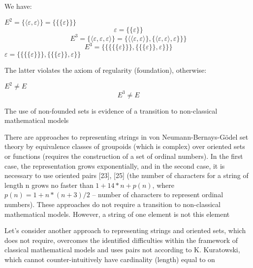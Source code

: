 \documentclass[10pt, a4paper]{article}
\begin{document}
\begin{multicols}{2}
We have:
\begin{center}
\vspace{0.3cm}
$E^2 = \{\langle \varepsilon, \varepsilon \rangle\} = \{\{\{\varepsilon\}\}\}$
\[\varepsilon = \{\{\varepsilon\}\}\]
\[E^3 = \{\langle \varepsilon, \varepsilon, \varepsilon\rangle\} = \{\langle\langle \varepsilon, \varepsilon \rangle\}, \{\langle \varepsilon, \varepsilon \rangle, \varepsilon\}\}\}\]
\[E^3 = \{\{\{\{\{\varepsilon\}\}\}, \{\{\{\varepsilon\}\}, \varepsilon\}\}\}\]
$\varepsilon = \{\{\{\{\varepsilon\}\}\}, \{\{\{\varepsilon\}\}, \varepsilon\}\}$
\vspace{0.35cm}
\end{center}
The latter violates the axiom of regularity (foundation),
otherwise:
\begin{center}
$E^2 \neq E$
\[E^3 \neq E\]
\end{center}
The use of non-founded sets is evidence of a transition
to non-classical mathematical models


There are approaches to representing strings in
von Neumann-Bernays-Gödel set theory by equivalence
classes of groupoids (which is complex) over oriented
sets or functions (requires the construction of a set of ordinal numbers). In the first case, the representation grows
exponentially, and in the second case, it is necessary to
use oriented pairs [23], [25] (the number of characters for
a string of length n grows no faster than $1+14*n+p (n)$,
where $p(n) = 1 + n*(n + 3)/2$ – number of characters
to represent ordinal numbers). These approaches do not
require a transition to non-classical mathematical models.
However, a string of one element is not this element


Let’s consider another approach to representing strings
and oriented sets, which does not require, overcomes the
identified difficulties within the framework of classical
mathematical models and uses pairs not according to
K. Kuratowski, which cannot counter-intuitively have
cardinality (length) equal to on


\end{multicols}
\end{document}
